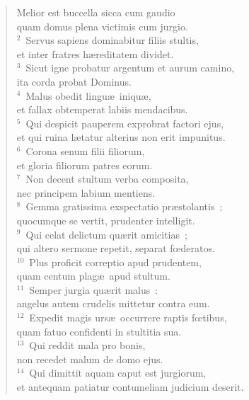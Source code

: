 \begin{flushleft}\begin{verse}\vspace{-19pt}\hspace{6pt}Melior est buccella sicca cum gaudio\\\hspace{6pt} quam domus plena victimis cum jurgio.\\
${}^{2}$~Servus sapiens dominabitur filiis stultis,\\ et inter fratres h\ae reditatem dividet.\\
${}^{3}$~Sicut igne probatur argentum et aurum camino,\\ ita corda probat Dominus.\\
${}^{4}$~Malus obedit lingu\ae\ iniqu\ae ,\\ et fallax obtemperat labiis mendacibus.\\
${}^{5}$~Qui despicit pauperem exprobrat factori ejus,\\ et qui ruina l\ae tatur alterius non erit impunitus.\\
${}^{6}$~Corona senum filii filiorum,\\ et gloria filiorum patres eorum.\\
${}^{7}$~Non decent stultum verba composita,\\ nec principem labium mentiens.\\
${}^{8}$~Gemma gratissima exspectatio pr\ae stolantis~;\\ quocumque se vertit, prudenter intelligit.\\
${}^{9}$~Qui celat delictum qu\ae rit amicitias~;\\ qui altero sermone repetit, separat fœderatos.\\
${}^{10}$~Plus proficit correptio apud prudentem,\\ quam centum plag\ae\ apud stultum.\\
${}^{11}$~Semper jurgia qu\ae rit malus~:\\ angelus autem crudelis mittetur contra eum.\\
${}^{12}$~Expedit magis urs\ae\ occurrere raptis fœtibus,\\ quam fatuo confidenti in stultitia sua.\\
${}^{13}$~Qui reddit mala pro bonis,\\ non recedet malum de domo ejus.\\
${}^{14}$~Qui dimittit aquam caput est jurgiorum,\\ et antequam patiatur contumeliam judicium deserit.\end{verse}\end{flushleft}


